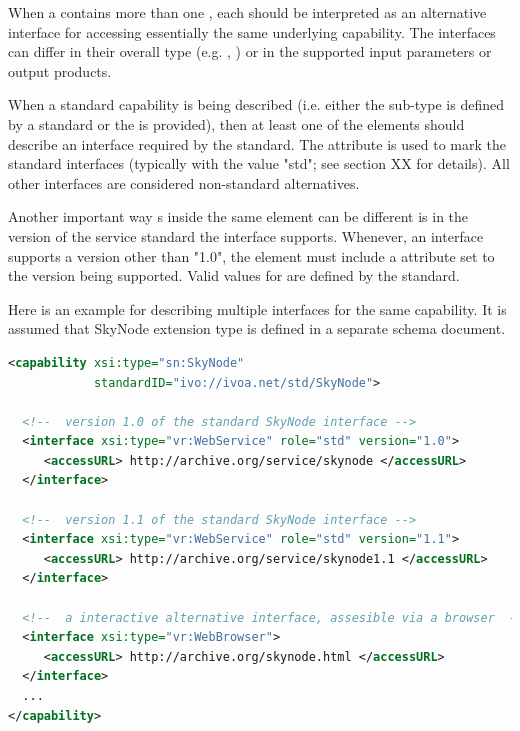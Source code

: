 \documentclass[11pt,a4paper]{ivoa}
\begin{document}
When a  contains more than one
, each  should be
interpreted as an alternative interface for accessing essentially the
same underlying capability.  The interfaces can differ in their
overall type (e.g. ,
) or in the supported input parameters or
output products.  


When a standard capability is being described (i.e. either the
 sub-type is defined by a standard or the
 is provided), then at least one of the
 elements should describe an interface required
by the standard.  The  attribute is used to mark the
standard interfaces (typically with the value "std"; see section XX
for details).  All other interfaces are considered non-standard
alternatives.



Another important way s inside the same
 element can be different is in the version of
the service standard the interface supports.  Whenever, an interface
supports a version other than "1.0", the 
element must include a  attribute set to the
version being supported.  Valid values for  are
defined by the standard.  

Here is an example for describing multiple interfaces for the same
capability. It is assumed that SkyNode extension type is defined in a
separate schema document.

\begin{lstlisting}[language=XML]
<capability xsi:type="sn:SkyNode"
            standardID="ivo://ivoa.net/std/SkyNode">

  <!--  version 1.0 of the standard SkyNode interface --> 
  <interface xsi:type="vr:WebService" role="std" version="1.0">
     <accessURL> http://archive.org/service/skynode </accessURL>
  </interface>

  <!--  version 1.1 of the standard SkyNode interface --> 
  <interface xsi:type="vr:WebService" role="std" version="1.1">
     <accessURL> http://archive.org/service/skynode1.1 </accessURL>
  </interface>

  <!--  a interactive alternative interface, assesible via a browser  --> 
  <interface xsi:type="vr:WebBrowser">
     <accessURL> http://archive.org/skynode.html </accessURL>
  </interface>
  ...
</capability>
\end{lstlisting}

\end{document}
